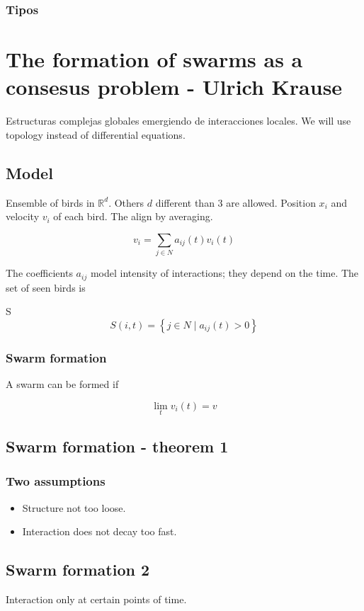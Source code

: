 \documentclass[11pt]{article}
\begin{document}
\subsubsection*{Tipos}
\label{sec-14-5-8}

\section*{The formation of swarms as a consesus problem - Ulrich Krause}
\label{sec-15}
Estructuras complejas globales emergiendo de interacciones locales.
We will use topology instead of differential equations.

\subsection*{Model}
\label{sec-15-1}
Ensemble of birds in $\mathbb{R}^{d}$. Others $d$ different than 3 are allowed.
Position $x_i$ and velocity $v_i$ of each bird. The align by averaging.

\[
v_i = \sum_{j \in N} a_{ij}(t) v_i(t)
\]

The coefficients $a_{ij}$ model intensity of interactions; they depend
on the time. The set of seen birds is

S\[
S(i,t) = \left\{ j \in N \mid a_{ij}(t) > 0 \right\}
\]

\subsubsection*{Swarm formation}
\label{sec-15-1-1}
A swarm can be formed if

\[
\lim_t v_{i}(t) = v
\]

\subsection*{Swarm formation - theorem 1}
\label{sec-15-2}
\subsubsection*{Two assumptions}
\label{sec-15-2-1}
\begin{itemize}
\item Structure not too loose.
\item Interaction does not decay too fast.
\end{itemize}
\subsection*{Swarm formation 2}
\label{sec-15-3}
Interaction only at certain points of time.
\end{document}
